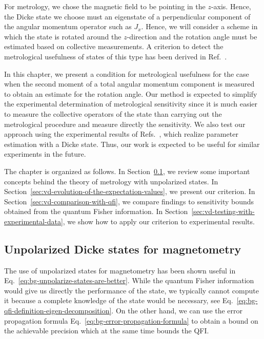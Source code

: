For metrology, we chose the magnetic field to be pointing in the $z$-axis.
Hence, the Dicke state we choose must an eigenstate of a perpendicular component of the angular momentum operator such as $J_x$.
Hence, we will consider a scheme in which the state is rotated around the $z$-direction and the rotation angle must be estimated based on collective measurements.
A criterion to detect the metrological usefulness of states of this type has been derived in Ref.~\cite{Zhang2014}.

In this chapter, we present a condition for metrological usefulness for the case when the second moment of a total angular momentum component is measured to obtain an estimate for the rotation angle.
Our method is expected to simplify the experimental determination of metrological sensitivity since it is much easier to measure the collective operators of the state than carrying out the metrological procedure and measure directly the sensitivity.
We also test our approach using the experimental results of Refs.~\cite{Luecke2011, Krischek2011}, which realize parameter estimation with a Dicke state.
Thus, our work is expected to be useful for similar experiments in the future.

The chapter is organized as follows.
In Section~\ref{sec:vd-unpolarized-states-magnetometry}, we review some important concepts behind the theory of metrology with unpolarized states.
In Section~\ref{sec:vd-evolution-of-the-expectation-values}, we present our criterion.
In Section~\ref{sec:vd-comparison-with-qfi}, we compare findings to sensitivity bounds obtained from the quantum Fisher information.
In Section~\ref{sec:vd-testing-with-experimental-data}, we show how to apply our criterion to experimental results.

\subsection{Unpolarized Dicke states for magnetometry}
\label{sec:vd-unpolarized-states-magnetometry}

The use of unpolarized states for magnetometry has been shown useful in Eq.~\eqref{eq:bg-unpolarize-states-are-better}.
While the quantum Fisher information would give us directly the performance of the state, we typically cannot compute it because a complete knowledge of the state would be necessary, see Eq.~\eqref{eq:bg-qfi-definition-eigen-decomposition}.
On the other hand, we can use the error propagation formula Eq.~\eqref{eq:bg-error-propagation-formula} to obtain a bound on the achievable precision which at the same time bounds the QFI.

